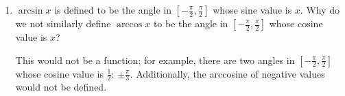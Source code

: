 \documentclass{article}
\begin{document}
\begin{enumerate}[topsep=0pt]
\begin{enumerate}[topsep=0pt]
\begin{solution}
      The problem with Silvio's reasoning is that, when he takes the
      $\arcsin$ of both sides, he gets
      \[ \arcsin(\sin 2.5) \approx \arcsin \left( 0.6 \right).\] However,
      it's not true that $\arcsin(\sin(2.5)) = 2.5$; as we saw in
      {{\#7}} on the worksheet, $\arcsin(\sin x)$ is only equal to $x$ for
      $x$ in $\left[ - \frac{\pi}{2}, \frac{\pi}{2} \right]$.
    \end{solution}

  \item
    \begin{problem}[\vfill]
      $\arcsin x$ is defined to be the angle in $\left[ - \frac{\pi}{2},
        \frac{\pi}{2} \right]$ whose sine value is $x$.  Why do we not
      similarly define $\arccos x$ to be the angle in $\left[ -
        \frac{\pi}{2}, \frac{\pi}{2} \right]$ whose cosine value is $x$?
    \end{problem}

    \begin{solution}
      This would not be a function; for example, there are two angles in
      $\left[ - \frac{\pi}{2}, \frac{\pi}{2} \right]$ whose cosine value
      is $\frac{1}{2}$: $\pm \frac{\pi}{3}$.  Additionally, the arccosine of negative values would not be defined.
    \end{solution}

  \end{enumerate}





\end{enumerate}
\end{document}
